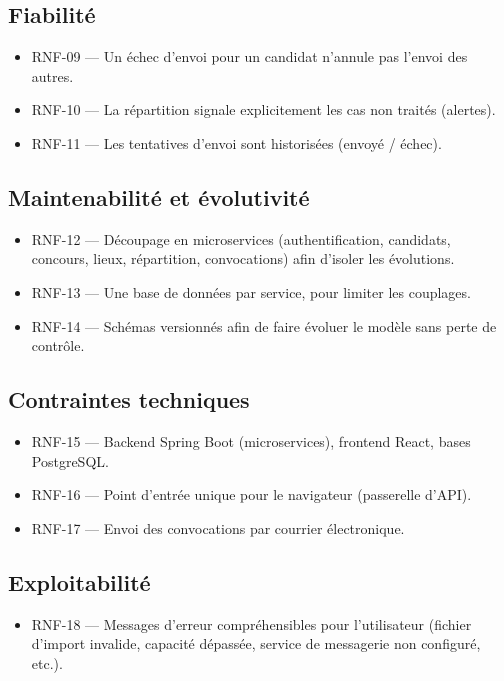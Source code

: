 \begin{onehalfspace}
\subsection{Fiabilité}

\begin{itemize}
  \item RNF-09 --- Un échec d'envoi pour un candidat n'annule pas l'envoi des autres.
  \item RNF-10 --- La répartition signale explicitement les cas non traités (alertes).
  \item RNF-11 --- Les tentatives d'envoi sont historisées (envoyé / échec).
\end{itemize}

\subsection{Maintenabilité et évolutivité}

\begin{itemize}
  \item RNF-12 --- Découpage en microservices (authentification, candidats, concours, lieux, répartition, convocations) afin d'isoler les évolutions.
  \item RNF-13 --- Une base de données par service, pour limiter les couplages.
  \item RNF-14 --- Schémas versionnés afin de faire évoluer le modèle sans perte de contrôle.
\end{itemize}

\subsection{Contraintes techniques}

\begin{itemize}
  \item RNF-15 --- Backend Spring Boot (microservices), frontend React, bases PostgreSQL.
  \item RNF-16 --- Point d'entrée unique pour le navigateur (passerelle d'API).
  \item RNF-17 --- Envoi des convocations par courrier électronique.
\end{itemize}

\subsection{Exploitabilité}

\begin{itemize}
  \item RNF-18 --- Messages d'erreur compréhensibles pour l'utilisateur (fichier d'import invalide, capacité dépassée, service de messagerie non configuré, etc.).
\end{itemize}


\end{onehalfspace}
